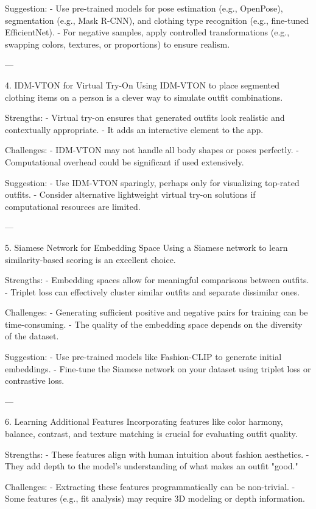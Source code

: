 Suggestion:
- Use pre-trained models for pose estimation (e.g., OpenPose), segmentation (e.g., Mask R-CNN), and clothing type recognition (e.g., fine-tuned EfficientNet).
- For negative samples, apply controlled transformations (e.g., swapping colors, textures, or proportions) to ensure realism.

---

4. IDM-VTON for Virtual Try-On
Using IDM-VTON to place segmented clothing items on a person is a clever way to simulate outfit combinations.

Strengths:
- Virtual try-on ensures that generated outfits look realistic and contextually appropriate.
- It adds an interactive element to the app.

Challenges:
- IDM-VTON may not handle all body shapes or poses perfectly.
- Computational overhead could be significant if used extensively.

Suggestion:
- Use IDM-VTON sparingly, perhaps only for visualizing top-rated outfits.
- Consider alternative lightweight virtual try-on solutions if computational resources are limited.

---

5. Siamese Network for Embedding Space
Using a Siamese network to learn similarity-based scoring is an excellent choice.

Strengths:
- Embedding spaces allow for meaningful comparisons between outfits.
- Triplet loss can effectively cluster similar outfits and separate dissimilar ones.

Challenges:
- Generating sufficient positive and negative pairs for training can be time-consuming.
- The quality of the embedding space depends on the diversity of the dataset.

Suggestion:
- Use pre-trained models like Fashion-CLIP to generate initial embeddings.
- Fine-tune the Siamese network on your dataset using triplet loss or contrastive loss.

---

6. Learning Additional Features
Incorporating features like color harmony, balance, contrast, and texture matching is crucial for evaluating outfit quality.

Strengths:
- These features align with human intuition about fashion aesthetics.
- They add depth to the model's understanding of what makes an outfit "good."

Challenges:
- Extracting these features programmatically can be non-trivial.
- Some features (e.g., fit analysis) may require 3D modeling or depth information.

